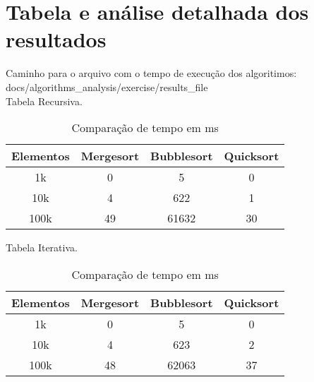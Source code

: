 \section{Tabela e análise detalhada dos resultados}
Caminho para o arquivo com o tempo de execução dos algoritimos: docs/algorithms_analysis/exercise/results_file \\

Tabela Recursiva. \\

\begin{table}[ht!]
    \centering
    \begin{tabular}{|c|c|c|c|}
    \hline
    \textbf{Elementos} &\textbf{Mergesort} & \textbf{Bubblesort} & \textbf{Quicksort} \\ \hline
     1k & 0 & 5 & 0  \\ \hline
     10k & 4 & 622 & 1  \\ \hline
     100k & 49 & 61632 & 30  \\ \hline
    \end{tabular}  
    \caption{Comparação de tempo em ms}
\end{table}

Tabela Iterativa. \\

\begin{table}[ht!]
    \centering
    \begin{tabular}{|c|c|c|c|}
    \hline
    \textbf{Elementos} &\textbf{Mergesort} & \textbf{Bubblesort} & \textbf{Quicksort} \\ \hline
     1k & 0 & 5 & 0  \\ \hline
     10k & 4 & 623 & 2  \\ \hline
     100k & 48 & 62063 & 37  \\ \hline
    \end{tabular}  
    \caption{Comparação de tempo em ms}
\end{table}




